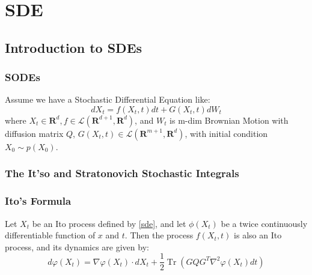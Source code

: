\chapter{SDE}
\section{Introduction to SDEs}
\subsection{SODEs}
\begin{problem}
    Assume we have a Stochastic Differential Equation like:
    \begin{equation}\label{sde}
        dX_t = f(X_t, t)dt + G(X_t, t)dW_t
    \end{equation}
    where $X_t\in \mathbf{R}^d,f\in \mathcal{L}(\mathbf{R}^{d+1}, \mathbf{R}^d)$, and $W_t$ is m-dim Brownian Motion with diffusion matrix $Q$, 
    $G(X_t, t)\in \mathcal{L}(\mathbf{R}^{m+1}, \mathbf{R}^d)$, with initial condition $X_0\sim p(X_0)$.
\end{problem}
\subsection{The It'so and Stratonovich Stochastic Integrals}
\subsection{Ito's Formula}
\begin{theorem}
    Let $X_t$ be an Ito process defined by \ref{sde}, and let $\phi(X_t)$ be a twice continuously differentiable function of $x$ and $t$. Then the process $f(X_t, t)$ is also an Ito process, and its dynamics are given by:
    \begin{equation}
        d\varphi(X_t) = \nabla \varphi(X_t)\cdot dX_t + \frac{1}{2}\operatorname{Tr}\left(GQG^T\nabla^2 \varphi(X_t)dt\right)
    \end{equation}
\end{theorem}


